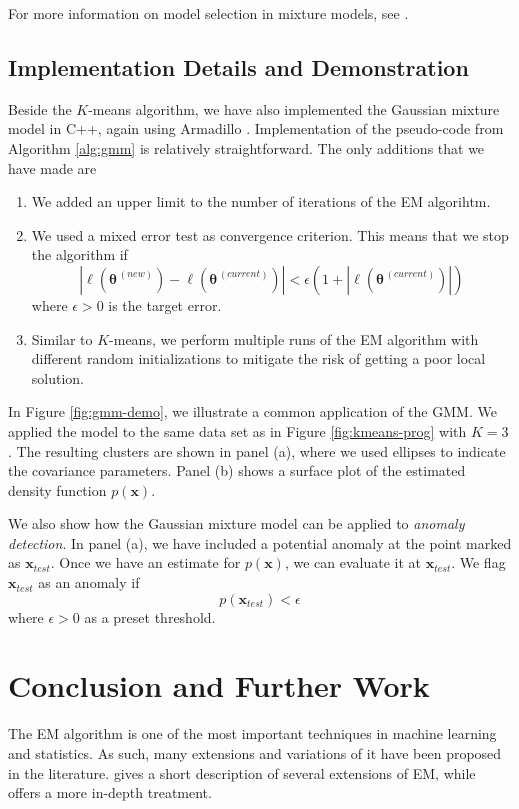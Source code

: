 \documentclass[final,3p,times,twocolumn]{elsarticle}
\let\bs\boldsymbol
\begin{document}
For more information on model selection in mixture models, see \cite{Murphy}.

\subsection{Implementation Details and Demonstration}

Beside the $K$-means algorithm, we have also implemented the Gaussian mixture model in C++, again using Armadillo \cite{armadillo}.
Implementation of the pseudo-code from Algorithm \ref{alg:gmm} is relatively straightforward.
The only additions that we have made are
\begin{enumerate}
\item We added an upper limit to the number of iterations of the EM algorihtm.
\item We used a mixed error test as convergence criterion.
This means that we stop the algorithm if
\begin{equation*}
|\ell(\bs\theta^{\,(new)}) - \ell(\bs\theta^{\,(current)})| < \epsilon \left(1 + |\ell(\bs\theta^{\,(current)})|\right)
\end{equation*}
where $\epsilon > 0$ is the target error.
\item Similar to $K$-means, we perform multiple runs of the EM algorithm with different random initializations to mitigate the risk of getting a poor local solution.
\end{enumerate}

In Figure \ref{fig:gmm-demo}, we illustrate a common application of the GMM.
We applied the model to the same data set as in Figure \ref{fig:kmeans-prog} with $K=3$.
The resulting clusters are shown in panel (a), where we used ellipses to indicate the covariance parameters.
Panel (b) shows a surface plot of the estimated density function $p(\bs x)$.

We also show how the Gaussian mixture model can be applied to \emph{anomaly detection}.
In panel (a), we have included a potential anomaly at the point marked as $\bs x_{test}$.
Once we have an estimate for $p(\bs x)$, we can evaluate it at $\bs x_{test}$.
We flag $\bs x_{test}$ as an anomaly if 
\begin{equation*}
p(\bs x_{test}) < \epsilon
\end{equation*}
where $\epsilon > 0$ as a preset threshold.



\section{Conclusion and Further Work}
\label{sect:concl}
The EM algorithm is one of the most important techniques in machine learning and statistics.
As such, many extensions and variations of it have been proposed in the literature.
\cite{Murphy} gives a short description of several extensions of EM, while \cite{mclachlan1997} offers a more in-depth treatment.
\end{document}
